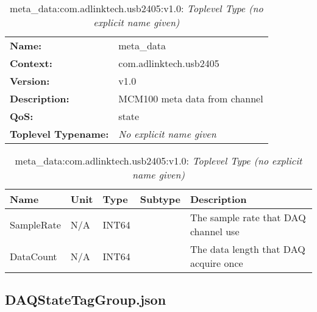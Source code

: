 \begin{table}[H]
\begin{tabularx}{\textwidth}{l X} 
       \textbf{Name:} & meta\_data \\ 
	   \textbf{Context:} & com.adlinktech.usb2405 \\ 
	   \textbf{Version:} & v1.0 \\ 
	   \textbf{Description:} & MCM100 meta data from channel \\ 
	   \textbf{QoS:} & state \\
	   \textbf{Toplevel Typename:} & \textit{No explicit name given} \\ 
\end{tabularx}
\caption{meta\_data:com.adlinktech.usb2405:v1.0}\label{ChannelMetaDataTagGroup.json:table:meta-underscore-data}
\bigskip
\begin{tabularx}{\textwidth}{l l l l X} 
	 \textbf{Name} & \textbf{Unit} & \textbf{Type} & \textbf{Subtype} & \textbf{Description} \\
	 \midrule
   SampleRate & N/A & INT64 &  & The sample rate that DAQ channel use \\
   DataCount & N/A & INT64 &  & The data length that DAQ acquire once \\
\end{tabularx}
\caption{meta\_data:com.adlinktech.usb2405:v1.0: \textit{Toplevel Type (no explicit name given)}}\label{ChannelMetaDataTagGroup.json:table:meta-underscore-data-no-type-given}


\end{table}

\subsection{DAQStateTagGroup.json}


